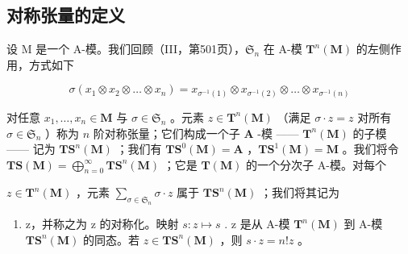 \subsection{对称张量的定义}

设 M 是一个 A-模。我们回顾（III，第501页），\(\mathfrak{S}_n\) 在 A-模 \(\mathbf{T}^n (\mathbf{M})\) 的左侧作用，方式如下

\[
\sigma \left(x _ {1} \otimes x _ {2} \otimes \dots \otimes x _ {n}\right) = x _ {\sigma^ {- 1} (1)} \otimes x _ {\sigma^ {- 1} (2)} \otimes \dots \otimes x _ {\sigma^ {- 1} (n)}
\]

对任意 \(x_{1},\ldots,x_{n}\in\mathbf{M}\) 与 \(\sigma\in\mathfrak{S}_{n}\) 。元素 \(z\in\mathbf{T}^{n}(\mathbf{M})\) （满足 \(\sigma\cdot z=z\) 对所有 \(\sigma\in\mathfrak{S}_{n}\) ）称为 \(n\) 阶对称张量；它们构成一个子 \(\mathbf{A}\) -模 —— \(\mathbf{T}^{n}(\mathbf{M})\) 的子模 —— 记为 \(\mathbf{T}\mathbf{S}^{n}(\mathbf{M})\) ；我们有 \(\mathbf{T}\mathbf{S}^{0}(\mathbf{M})=\mathbf{A}\) ，\(\mathbf{T}\mathbf{S}^{1}(\mathbf{M})=\mathbf{M}\) 。我们将令 \(\mathbf{T}\mathbf{S}(\mathbf{M}) = \bigoplus_{n=0}^{\infty} \mathbf{T}\mathbf{S}^{n}(\mathbf{M})\) ；它是 \(\mathbf{T}(\mathbf{M})\) 的一个分次子 A-模。对每个

\(z \in \mathbf{T}^n(\mathbf{M})\) ，元素 \(\sum_{\sigma \in \mathfrak{S}_n} \sigma \cdot z\) 属于 \(\mathbf{T}\mathbf{S}^n(\mathbf{M})\) ；我们将其记为

\begin{enumerate}
\def\labelenumi{\alph{enumi}.}
\setcounter{enumi}{18}
\tightlist
\item
  z，并称之为 z 的对称化。映射 \(s: z \mapsto s\) . z 是从 A-模 \(\mathbf{T}^{n}(\mathbf{M})\) 到 A-模 \(\mathbf{T}\mathbf{S}^{n}(\mathbf{M})\) 的同态。若 \(z \in \mathbf{T}\mathbf{S}^{n}(\mathbf{M})\) ，则 \(s \cdot z = n! z\) 。
\end{enumerate}

